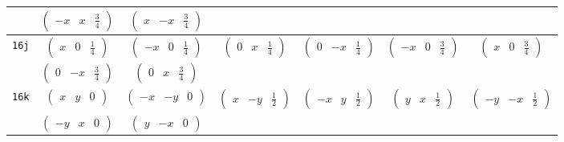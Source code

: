 \documentclass[fleqn,9pt,landscape]{jsarticle}
\begin{document}
\begin{center}
\begin{longtable}{ccccccc}
& $ \begin{pmatrix} - x & x & \frac{3}{4} \end{pmatrix} $ & $ \begin{pmatrix} x & - x & \frac{3}{4} \end{pmatrix} $ & $  $ & $  $ & $  $ & $  $ \\ \hline
{\tt 16j} & $ \begin{pmatrix} x & 0 & \frac{1}{4} \end{pmatrix} $ & $ \begin{pmatrix} - x & 0 & \frac{1}{4} \end{pmatrix} $ & $ \begin{pmatrix} 0 & x & \frac{1}{4} \end{pmatrix} $ & $ \begin{pmatrix} 0 & - x & \frac{1}{4} \end{pmatrix} $ & $ \begin{pmatrix} - x & 0 & \frac{3}{4} \end{pmatrix} $ & $ \begin{pmatrix} x & 0 & \frac{3}{4} \end{pmatrix} $ \\
& $ \begin{pmatrix} 0 & - x & \frac{3}{4} \end{pmatrix} $ & $ \begin{pmatrix} 0 & x & \frac{3}{4} \end{pmatrix} $ & $  $ & $  $ & $  $ & $  $ \\ \hline
{\tt 16k} & $ \begin{pmatrix} x & y & 0 \end{pmatrix} $ & $ \begin{pmatrix} - x & - y & 0 \end{pmatrix} $ & $ \begin{pmatrix} x & - y & \frac{1}{2} \end{pmatrix} $ & $ \begin{pmatrix} - x & y & \frac{1}{2} \end{pmatrix} $ & $ \begin{pmatrix} y & x & \frac{1}{2} \end{pmatrix} $ & $ \begin{pmatrix} - y & - x & \frac{1}{2} \end{pmatrix} $ \\
& $ \begin{pmatrix} - y & x & 0 \end{pmatrix} $ & $ \begin{pmatrix} y & - x & 0 \end{pmatrix} $ & $  $ & $  $ & $  $ & $  $ \\ \hline

\end{longtable}
\end{center}
\end{document}

